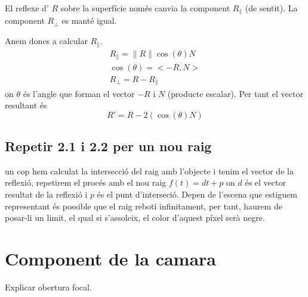 \documentclass{article}
\begin{document}
El reflexe d' $R$ sobre la superfície només canvia la component $R_{\parallel}$ (de sentit). La component  $R_{\bot}$ es manté igual.


Anem doncs a calcular $R_{\parallel}$.
\begin{align} 
   R_{\parallel}=\|R\| \cos(\theta)  N \\
   \cos(\theta) = <-R , N> \\
   R_{\bot}= R-R_{\parallel}
\end{align}
on $\theta$ és l'angle que forman el vector  $-R$ i  $N$ (producte escalar).
Per tant el vector resultant és
\begin{equation*}
   R'= R-2(\cos(\theta)N)
\end{equation*}

\subsection{Repetir 2.1 i 2.2 per un nou raig}
un cop hem calculat la intersecció del raig amb l'objecte i tenim el vector de la reflexió, repetirem el procés amb el nou raig
$f(t)=dt+p$ on  $d$ és el vector resultat de la reflexió i  $p$ és el punt d'interseció. Depen de l'escena que estiguem
representant és possible que el raig reboti infinitament, per tant, haurem de posar-li un limit, el qual si s'assoleix, el color
d'aquest píxel serà negre.
\section{Component de la camara}
Explicar obertura focal.
\end{document}

